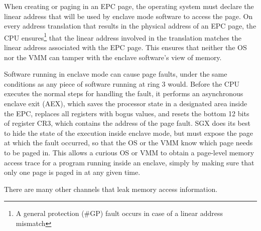 When creating or paging in an EPC page, the operating system must declare the
linear address that will be used by enclave mode software to access the page.
On every address translation that results in the physical address of an EPC
page, the CPU ensures\footnote{A general protection (\#GP) fault occurs in case
of a linear address mismatch} that the linear address involved in the
translation matches the linear address associated with the EPC page. This
ensures that neither the OS nor the VMM can tamper with the enclave software's
view of memory.

Software running in enclave mode can cause page faults, under the same
conditions as any piece of software running at ring 3 would. Before the CPU
executes the normal steps for handling the fault, it performs an asynchronous
enclave exit (AEX), which saves the processor state in a designated area inside
the EPC, replaces all registers with bogus values, and resets the bottom 12
bits of register CR3, which contains the address of the page fault. SGX does
its best to hide the state of the execution inside enclave mode, but must
expose the page at which the fault occurred, so that the OS or the VMM know
which page needs to be paged in. This allows a curious OS or VMM to obtain a
page-level memory access trace for a program running inside an enclave, simply
by making sure that only one page is paged in at any given time.

There are many other channels that leak memory access information.

